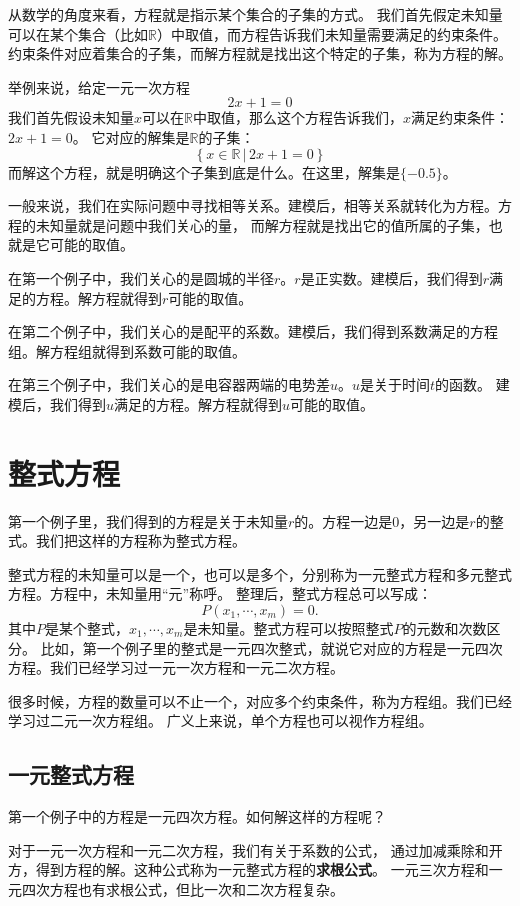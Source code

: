 \documentclass[12pt,UTF8]{ctexbook}
\theoremstyle{definition}
\theoremstyle{plain}
\begin{document}
从数学的角度来看，方程就是指示某个集合的子集的方式。
我们首先假定未知量可以在某个集合（比如$\mathbb{R}$）中取值，而方程告诉我们未知量需要满足的约束条件。
约束条件对应着集合的子集，而解方程就是找出这个特定的子集，称为方程的解。

举例来说，给定一元一次方程
$$ 2x + 1 = 0$$
我们首先假设未知量$x$可以在$\mathbb{R}$中取值，那么这个方程告诉我们，$x$满足约束条件：$2x+1=0$。
它对应的解集是$\mathbb{R}$的子集：
$$ \left\{ x\in\mathbb{R} \, | \, 2x + 1 = 0 \right\} $$
而解这个方程，就是明确这个子集到底是什么。在这里，解集是$\{-0.5\}$。

一般来说，我们在实际问题中寻找相等关系。建模后，相等关系就转化为方程。方程的未知量就是问题中我们关心的量，
而解方程就是找出它的值所属的子集，也就是它可能的取值。

在第一个例子中，我们关心的是圆城的半径$r$。$r$是正实数。建模后，我们得到$r$满足的方程。解方程就得到$r$可能的取值。

在第二个例子中，我们关心的是配平的系数。建模后，我们得到系数满足的方程组。解方程组就得到系数可能的取值。

在第三个例子中，我们关心的是电容器两端的电势差$u$。$u$是关于时间$t$的函数。
建模后，我们得到$u$满足的方程。解方程就得到$u$可能的取值。

\section{整式方程}

第一个例子里，我们得到的方程是关于未知量$r$的。方程一边是$0$，另一边是$r$的整式。我们把这样的方程称为整式方程。

整式方程的未知量可以是一个，也可以是多个，分别称为一元整式方程和多元整式方程。方程中，未知量用“元”称呼。
整理后，整式方程总可以写成：
$$ P(x_1, \cdots ,x_m) = 0.$$
其中$P$是某个整式，$x_1, \cdots ,x_m$是未知量。整式方程可以按照整式$P$的元数和次数区分。
比如，第一个例子里的整式是一元四次整式，就说它对应的方程是一元四次方程。我们已经学习过一元一次方程和一元二次方程。

很多时候，方程的数量可以不止一个，对应多个约束条件，称为方程组。我们已经学习过二元一次方程组。
广义上来说，单个方程也可以视作方程组。

\subsection{一元整式方程}

第一个例子中的方程是一元四次方程。如何解这样的方程呢？

对于一元一次方程和一元二次方程，我们有关于系数的公式，
通过加减乘除和开方，得到方程的解。这种公式称为一元整式方程的\textbf{求根公式}。
一元三次方程和一元四次方程也有求根公式，但比一次和二次方程复杂。
\end{document}
